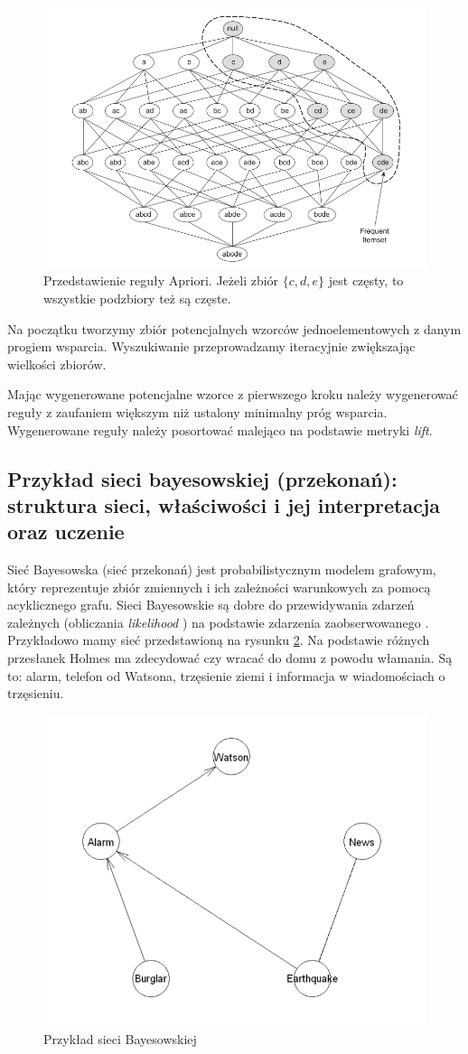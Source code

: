\documentclass[wi]{zut}
\begin{document}
\begin{figure}[H]
    \centering
    \includegraphics[width=0.5\linewidth]{images/apriori.png}
    \caption{Przedstawienie reguły Apriori. Jeżeli zbiór $\{c, d, e\}$ jest częsty, to wszystkie podzbiory też są częste.}
    \label{fig:apriori}
\end{figure}


Na początku tworzymy zbiór potencjalnych wzorców jednoelementowych z danym progiem wsparcia. Wyszukiwanie przeprowadzamy iteracyjnie zwiększając wielkości zbiorów. 

Mając wygenerowane potencjalne wzorce z pierwszego kroku należy wygenerować reguły z zaufaniem większym niż ustalony minimalny próg wsparcia. Wygenerowane reguły należy posortować malejąco na podstawie metryki \emph{lift}.

\subsection{Przykład sieci bayesowskiej (przekonań): struktura sieci, właściwości i jej interpretacja oraz uczenie}

Sieć Bayesowska (sieć przekonań) jest probabilistycznym modelem grafowym, który reprezentuje zbiór zmiennych i ich zależności warunkowych za pomocą acyklicznego grafu. Sieci Bayesowskie są dobre do przewidywania zdarzeń zależnych (obliczania \emph{likelihood} \cite{wiki:Likelihood_function}) na podstawie zdarzenia zaobserwowanego 
\cite{wiki:Bayesian_network}. Przykładowo mamy sieć przedstawioną na rysunku \ref{fig:bayesian}. Na podstawie różnych przesłanek Holmes ma zdecydować czy wracać do domu z powodu włamania. Są to: alarm, telefon od Watsona, trzęsienie ziemi i informacja w wiadomościach o trzęsieniu.


\begin{figure}[H]
    \centering
    \includegraphics[width=0.5\linewidth]{images/bayesian.png}
    \caption{Przykład sieci Bayesowskiej}
    \label{fig:bayesian}
\end{figure}
\end{document}

